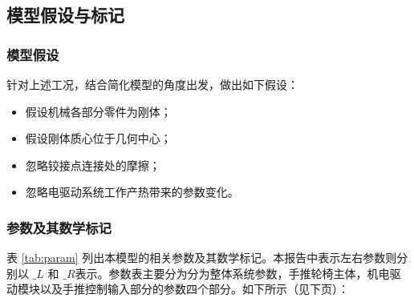 \subsection{模型假设与标记}

\subsubsection{模型假设}

针对上述工况，结合简化模型的角度出发，做出如下假设：

\begin{itemize}
	
	\item 假设机械各部分零件为刚体；
	
	\item 假设刚体质心位于几何中心；
	
	\item 忽略铰接点连接处的摩擦；
	
	\item 忽略电驱动系统工作产热带来的参数变化。
	
\end{itemize}

\subsubsection{参数及其数学标记}

表 \ref{tab:param} 列出本模型的相关参数及其数学标记。本报告中表示左右参数则分别以 $ \_L $ 和 $ \_R $表示。参数表主要分为分为整体系统参数，手推轮椅主体，机电驱动模块以及手推控制输入部分的参数四个部分。如下所示（见下页）：

